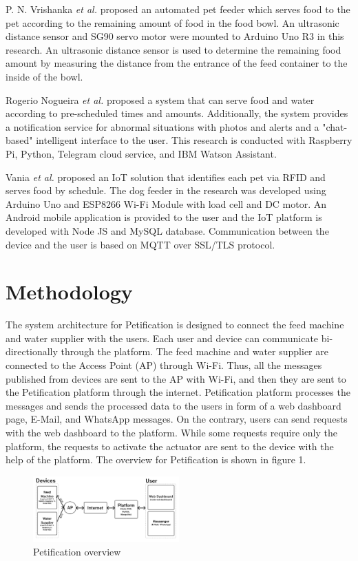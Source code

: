﻿\documentclass[conference]{IEEEtran}
\begin{document}
P. N. Vrishanka \textit{et al.} \cite{b9} proposed an automated pet feeder which serves food to the pet according to the remaining amount of food in the food bowl.
An ultrasonic distance sensor and SG90 servo motor were mounted to Arduino Uno R3 in this research.
An ultrasonic distance sensor is used to determine the remaining food amount by measuring the distance from the entrance of the feed container to the inside of the bowl.

Rogerio Nogueira \textit{et al.} \cite{b10} proposed a system that can serve food and water according to pre-scheduled times and amounts.
Additionally, the system provides a notification service for abnormal situations with photos and alerts and a "chat-based" intelligent interface to the user.
This research is conducted with Raspberry Pi, Python, Telegram cloud service, and IBM Watson Assistant.

Vania \textit{et al.} \cite{b11} proposed an IoT solution that identifies each pet via RFID and serves food by schedule.
The dog feeder in the research was developed using Arduino Uno and ESP8266 Wi-Fi Module with load cell and DC motor.
An Android mobile application is provided to the user and the IoT platform is developed with Node JS and MySQL database.
Communication between the device and the user is based on MQTT over SSL/TLS protocol.

\section{Methodology}
The system architecture for Petification is designed to connect the feed machine and water supplier with the users.
Each user and device can communicate bi-directionally through the platform.
The feed machine and water supplier are connected to the Access Point (AP) through Wi-Fi.
Thus, all the messages published from devices are sent to the AP with Wi-Fi, and then they are sent to the Petification platform through the internet.
Petification platform processes the messages and sends the processed data to the users in form of a web dashboard page, E-Mail, and WhatsApp messages.
On the contrary, users can send requests with the web dashboard to the platform.
While some requests require only the platform, the requests to activate the actuator are sent to the device with the help of the platform.
The overview for Petification is shown in figure 1.

\begin{figure}[htbp]
\centerline{\includegraphics[width=0.5\textwidth]{./images/Overview.png}}
\caption{Petification overview}
\label{fig}
\end{figure}
\end{document}
